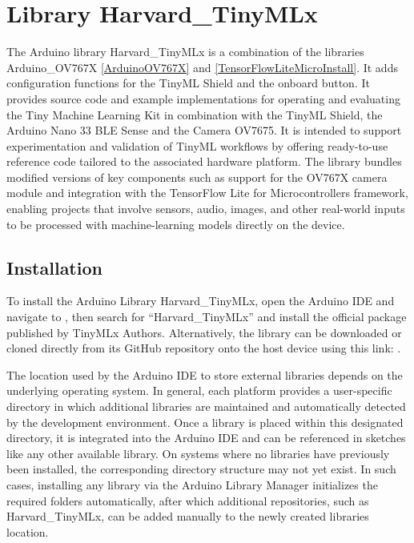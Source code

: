 %
%

\chapter{Library Harvard\_TinyMLx} \label{HarvardTinyMLx}
The Arduino library Harvard\_TinyMLx is a combination of the libraries Arduino\_OV767X \ref{ArduinoOV767X} and \ref{TensorFlowLiteMicroInstall}. It adds configuration functions for the TinyML Shield and the onboard button. It provides source code and example implementations for operating and evaluating the Tiny Machine Learning Kit in combination with the TinyML Shield, the Arduino Nano 33 BLE Sense and the Camera OV7675. It is intended to support experimentation and validation of TinyML workflows by offering ready-to-use reference code tailored to the associated hardware platform. The library bundles modified versions of key components such as support for the OV767X camera module and integration with the TensorFlow Lite for Microcontrollers framework, enabling projects that involve sensors, audio, images, and other real-world inputs to be processed with machine-learning models directly on the device. \cite{Harvard:2025} 

\section{Installation}
To install the Arduino Library Harvard\_TinyMLx, open the Arduino IDE and navigate to , then search for “Harvard\_TinyMLx” and install the official package published by TinyMLx Authors. Alternatively, the library can be downloaded or cloned directly from its GitHub repository onto the host device using this link: .

The location used by the Arduino IDE to store external libraries depends on the underlying operating system. In general, each platform provides a user-specific directory in which additional libraries are maintained and automatically detected by the development environment. Once a library is placed within this designated directory, it is integrated into the Arduino IDE and can be referenced in sketches like any other available library. On systems where no libraries have previously been installed, the corresponding directory structure may not yet exist. In such cases, installing any library via the Arduino Library Manager initializes the required folders automatically, after which additional repositories, such as Harvard\_TinyMLx, can be added manually to the newly created libraries location.

